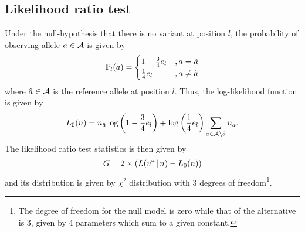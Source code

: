 \documentclass{article}
\begin{document}
\subsection{Likelihood ratio test}
Under the null-hypothesis that there is no variant at position $l$, the probability of observing allele $ a \in \A$ is given by 
\begin{align*}
\P_l(a) = \begin{cases}
1 - \frac{3}{4} e_l & , a = \hat{a} \\
\frac{1}{4} e_l & , a \neq \hat{a}
\end{cases}
\end{align*}
where $\hat{a} \in \A$ is the reference allele at position $l$. Thus, the log-likelihood function is given by 
\begin{align*}
L_0(n) = n_{\hat{a}} \log\brac{1 - \frac{3}{4} e_l } + \log\brac{\frac{1}{4} e_l } \sum_{a \in \A \setminus{\hat{a}}} n_a. 
\end{align*}
The likelihood ratio test statistics is then given by 
\begin{align*}
G = 2 \times \brac{L(v^* \wh n) - L_0(n)}
\end{align*}
and its distribution is given by $\chi^2$ distribution with 3 degrees of freedom\footnote{The degree of freedom for the null model is zero while that of the alternative is 3, given by 4 parameters which sum to a given constant.}.
\end{document}
